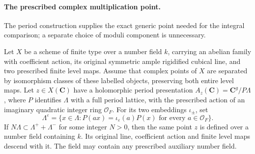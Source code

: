 \paragraph{The prescribed complex multiplication point.}
The period construction supplies the exact generic point needed for
the integral comparison; a separate choice of moduli component is
unnecessary.

\begin{proposition}\label{geo-cm-period-point-descent}
Let $X$ be a scheme of finite type over a number field $k$, carrying
an abelian family with coefficient action, its original symmetric
ample rigidified cubical line, and two prescribed finite level maps.
Assume that complex points of $X$ are separated by isomorphism classes
of these labelled objects, preserving both entire level maps.
Let $z\in X(\mathbf C)$ have a holomorphic period presentation
$A_z(\mathbf C)=\mathbf C^g/P\Lambda$, where $P$ identifies $\Lambda$
with a full period lattice, with the prescribed action of
an imaginary quadratic integer ring $\mathcal O_F$.
For its two embeddings $\iota_\pm$, set
\[
 \Lambda^\varepsilon=
 \{x\in\Lambda:P(ax)=\iota_\varepsilon(a)P(x)
                   \text{ for every }a\in\mathcal O_F\}.
\]
If $N\Lambda\subset\Lambda^++\Lambda^-$ for some integer $N>0$,
then the same point $z$ is defined over a number field containing $k$.
Its original line, coefficient action and finite level maps descend
with it. The field may contain any prescribed auxiliary number field.
\end{proposition}
